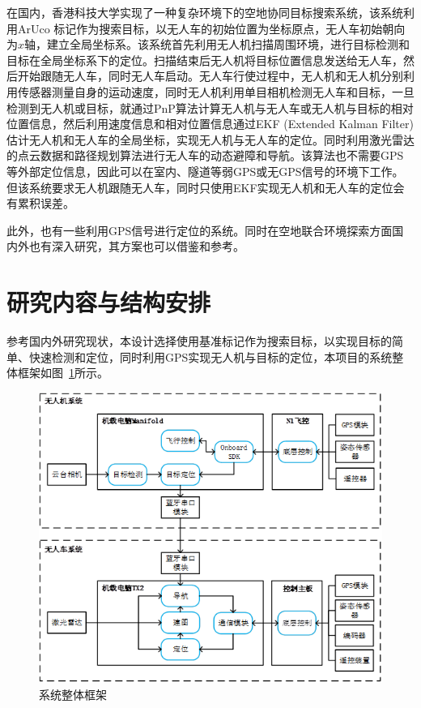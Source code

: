 在国内，香港科技大学实现了一种复杂环境下的空地协同目标搜索系统，该系统利用ArUco 标记作为搜索目标，以无人车的初始位置为坐标原点，无人车初始朝向为$x$轴，建立全局坐标系。该系统首先利用无人机扫描周围环境，进行目标检测和目标在全局坐标系下的定位。扫描结束后无人机将目标位置信息发送给无人车，然后开始跟随无人车，同时无人车启动。无人车行使过程中，无人机和无人机分别利用传感器测量自身的运动速度，同时无人机利用单目相机检测无人车和目标，一旦检测到无人机或目标，就通过PnP算法计算无人机与无人车或无人机与目标的相对位置信息，然后利用速度信息和相对位置信息通过EKF (Extended Kalman Filter)估计无人机和无人车的全局坐标，实现无人机与无人车的定位。同时利用激光雷达的点云数据和路径规划算法进行无人车的动态避障和导航。该算法也不需要GPS等外部定位信息，因此可以在室内、隧道等弱GPS或无GPS信号的环境下工作。但该系统要求无人机跟随无人车，同时只使用EKF实现无人机和无人车的定位会有累积误差。

此外，也有一些利用GPS信号进行定位的系统。同时在空地联合环境探索方面国内外也有深入研究，其方案也可以借鉴和参考。

\section{研究内容与结构安排}
参考国内外研究现状，本设计选择使用基准标记作为搜索目标，以实现目标的简单、快速检测和定位，同时利用GPS实现无人机与目标的定位，本项目的系统整体框架如图~\ref{fig:1-1}所示。

\begin{figure}[htb]
	\centering
	\includegraphics[width=\linewidth]{figures/1-1.png}
	\caption{系统整体框架}
	\label{fig:1-1}
\end{figure}

